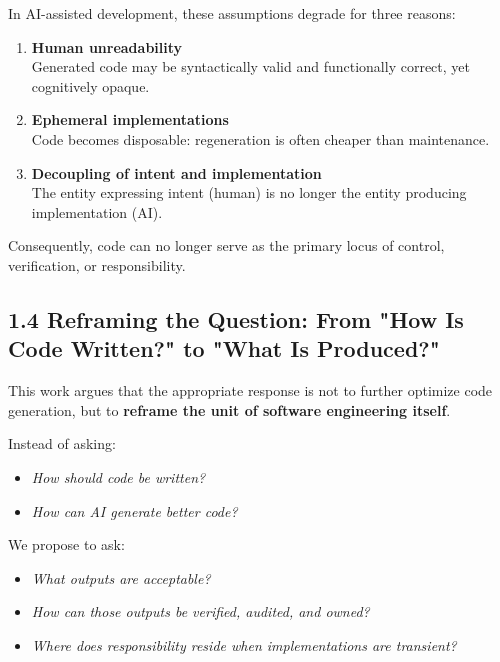 \documentclass[
]{article}
\begin{document}
In AI-assisted development, these assumptions degrade for three reasons:

\begin{enumerate}
\def\labelenumi{\arabic{enumi}.}
\item
  \textbf{Human unreadability}\\
  Generated code may be syntactically valid and functionally correct,
  yet cognitively opaque.
\item
  \textbf{Ephemeral implementations}\\
  Code becomes disposable: regeneration is often cheaper than
  maintenance.
\item
  \textbf{Decoupling of intent and implementation}\\
  The entity expressing intent (human) is no longer the entity producing
  implementation (AI).
\end{enumerate}

Consequently, code can no longer serve as the primary locus of control,
verification, or responsibility.

\hypertarget{14-reframing-the-question-from-how-is-code-written-to-what-is-produced}{%
\subsection{1.4 Reframing the Question: From "How Is Code Written?" to
"What Is
Produced?"}\label{14-reframing-the-question-from-how-is-code-written-to-what-is-produced}}

This work argues that the appropriate response is not to further
optimize code generation, but to \textbf{reframe the unit of software
engineering itself}.

Instead of asking:

\begin{itemize}
\item
  \emph{How should code be written?}
\item
  \emph{How can AI generate better code?}
\end{itemize}

We propose to ask:

\begin{itemize}
\item
  \emph{What outputs are acceptable?}
\item
  \emph{How can those outputs be verified, audited, and owned?}
\item
  \emph{Where does responsibility reside when implementations are
  transient?}
\end{itemize}
\end{document}
